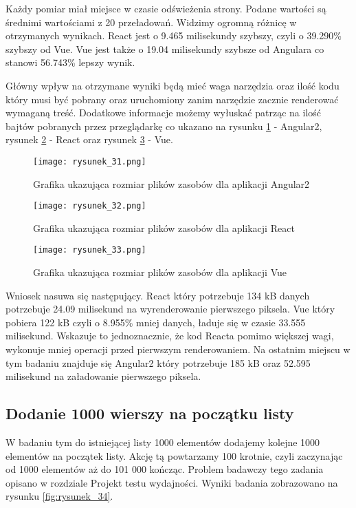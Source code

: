Każdy pomiar miał miejsce w czasie odświeżenia strony.
Podane wartości są średnimi wartościami z 20 przeładowań.
Widzimy ogromną różnicę w otrzymanych wynikach. React jest o 9.465 milisekundy szybszy, czyli o 39.290\% szybszy od Vue.
Vue jest także o 19.04 milisekundy szybsze od Angulara co stanowi 56.743\% lepszy wynik.

Główny wpływ na otrzymane wyniki będą mieć waga narzędzia oraz ilość kodu który musi być pobrany oraz uruchomiony zanim narzędzie zacznie renderować wymaganą treść.
Dodatkowe informacje możemy wyłuskać patrząc na ilość bajtów pobranych przez przeglądarkę co ukazano na rysunku \ref{fig:rysunek_31} - Angular2, rysunek \ref{fig:rysunek_32} - React oraz rysunek \ref{fig:rysunek_33} - Vue.

\begin{figure}[htbp]
    \centering
    \texttt{[image: rysunek\_31.png]}
    \caption{Grafika ukazująca rozmiar plików zasobów dla aplikacji Angular2}
    \label{fig:rysunek_31}
\end{figure}

\begin{figure}[htbp]
    \centering
    \texttt{[image: rysunek\_32.png]}
    \caption{Grafika ukazująca rozmiar plików zasobów dla aplikacji React}
    \label{fig:rysunek_32}
\end{figure}

\begin{figure}[htbp]
    \centering
    \texttt{[image: rysunek\_33.png]}
    \caption{Grafika ukazująca rozmiar plików zasobów dla aplikacji Vue}
    \label{fig:rysunek_33}
\end{figure}

Wniosek nasuwa się następujący. React który potrzebuje 134 kB danych potrzebuje 24.09 milisekund na wyrenderowanie pierwszego piksela.
Vue który pobiera 122 kB czyli o 8.955\% mniej danych, ładuje się w czasie 33.555 milisekund.
Wskazuje to jednoznacznie, że kod Reacta pomimo większej wagi, wykonuje mniej operacji przed pierwszym renderowaniem.
Na ostatnim miejscu w tym badaniu znajduje się Angular2 który potrzebuje 185 kB oraz 52.595 milisekund na załadowanie pierwszego piksela.

\clearpage
\subsection{Dodanie 1000 wierszy na początku listy}

W badaniu tym do istniejącej listy 1000 elementów dodajemy kolejne 1000 elementów na początek listy.
Akcję tą powtarzamy 100 krotnie, czyli zaczynając od 1000 elementów aż do 101 000 kończąc.
Problem badawczy tego zadania opisano w rozdziale Projekt testu wydajności.
Wyniki badania zobrazowano na rysunku \ref{fig:rysunek_34}.

